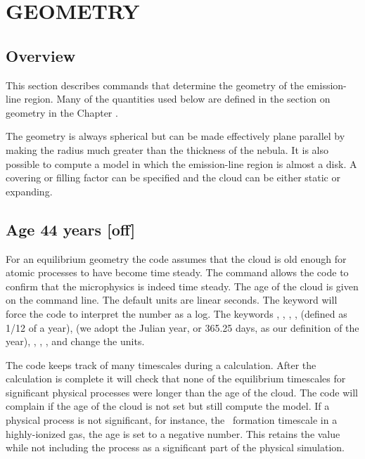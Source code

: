 \chapter{GEOMETRY}

\section{Overview}

This section describes commands that determine the geometry of the
emission-line region.
Many of the quantities used below are defined in
the section on geometry in the Chapter .

The geometry is always spherical but can be made effectively plane
parallel by making the radius much greater than the
thickness of the nebula.
It is also possible to compute a model in which the emission-line region
is almost a disk.
A covering or filling factor can be specified and the
cloud can be either static or expanding.

\section{Age 44 years [off]}
\label{sec:AgeCommand}

For an equilibrium geometry the code assumes that the cloud is old enough for
atomic processes to have become time steady.
The  command allows the
code to confirm that the microphysics is indeed time steady.
The age of
the cloud is given on the command line.
The default units are linear
seconds.
The keyword  will force the code to interpret the number as
a log.
The keywords , , ,
,  (defined as 1/12 of a year),
 (we adopt the Julian year, or 365.25 days, as our definition
of the year), , , ,
and  change the units.

The code keeps track of many timescales during a calculation.
After the calculation is complete it will check that none of the
equilibrium timescales for significant physical processes
were longer than the age of the cloud.
The code will complain if the age of the cloud is not set but
still compute the model.
If a physical process is not significant, for
instance, the \htwo\ formation timescale in a highly-ionized gas,
the age is
set to a negative number.
This retains the value while not including the
process as a significant part of the physical simulation.

